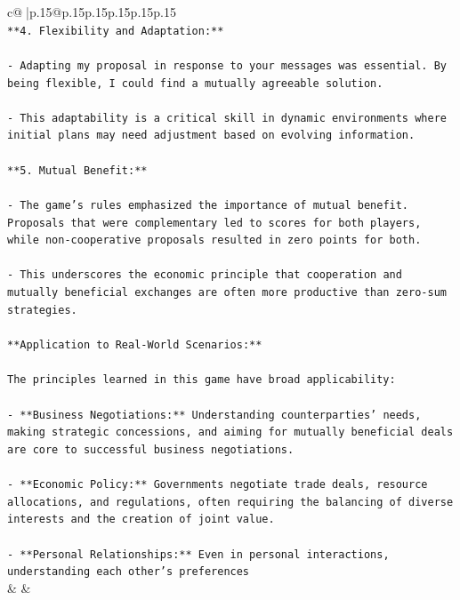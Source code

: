 \documentclass{article}
\begin{document}
{\begin{supertabular}{c@{$\;$}|p{.15\linewidth}@{}p{.15\linewidth}p{.15\linewidth}p{.15\linewidth}p{.15\linewidth}p{.15\linewidth}}
{{{\\ 
\texttt{**4. Flexibility and Adaptation:**} \\
\\ 
\texttt{{-} Adapting my proposal in response to your messages was essential. By being flexible, I could find a mutually agreeable solution.} \\
\\ 
\texttt{{-} This adaptability is a critical skill in dynamic environments where initial plans may need adjustment based on evolving information.} \\
\\ 
\texttt{**5. Mutual Benefit:**} \\
\\ 
\texttt{{-} The game's rules emphasized the importance of mutual benefit. Proposals that were complementary led to scores for both players, while non{-}cooperative proposals resulted in zero points for both.} \\
\\ 
\texttt{{-} This underscores the economic principle that cooperation and mutually beneficial exchanges are often more productive than zero{-}sum strategies.} \\
\\ 
\texttt{**Application to Real{-}World Scenarios:**} \\
\\ 
\texttt{The principles learned in this game have broad applicability:} \\
\\ 
\texttt{{-} **Business Negotiations:** Understanding counterparties' needs, making strategic concessions, and aiming for mutually beneficial deals are core to successful business negotiations.} \\
\\ 
\texttt{{-} **Economic Policy:** Governments negotiate trade deals, resource allocations, and regulations, often requiring the balancing of diverse interests and the creation of joint value.} \\
\\ 
\texttt{{-} **Personal Relationships:** Even in personal interactions, understanding each other's preferences} \\
            }
        }
    }
    & & \\ \\


\end{supertabular}}
\end{document}
